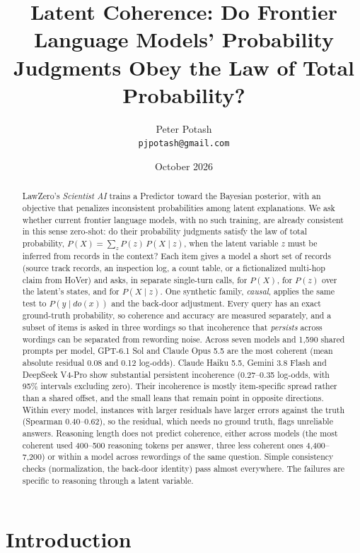 \documentclass[11pt]{article}
\title{\textbf{Latent Coherence: Do Frontier Language Models' Probability\\Judgments Obey the Law of Total Probability?}}
\author{Peter Potash\\\small\texttt{pjpotash@gmail.com}}
\date{October 2026}
\begin{document}
\maketitle

\begin{abstract}
LawZero's \emph{Scientist AI} trains a Predictor toward the Bayesian posterior, with an objective that penalizes inconsistent probabilities among latent explanations. We ask whether current frontier language models, with no such training, are already consistent in this sense zero-shot: do their probability judgments satisfy the law of total probability, $P(X)=\sum_z P(z)\,P(X\mid z)$, when the latent variable $z$ must be inferred from records in the context? Each item gives a model a short set of records (source track records, an inspection log, a count table, or a fictionalized multi-hop claim from HoVer) and asks, in separate single-turn calls, for $P(X)$, for $P(z)$ over the latent's states, and for $P(X\mid z)$. One synthetic family, \emph{causal}, applies the same test to $P(y\mid do(x))$ and the back-door adjustment. Every query has an exact ground-truth probability, so coherence and accuracy are measured separately, and a subset of items is asked in three wordings so that incoherence that \emph{persists} across wordings can be separated from rewording noise. Across seven models and 1,590 shared prompts per model, GPT-6.1 Sol and Claude Opus 5.5 are the most coherent (mean absolute residual 0.08 and 0.12 log-odds). Claude Haiku 5.5, Gemini 3.8 Flash and DeepSeek V4-Pro show substantial persistent incoherence (0.27--0.35 log-odds, with 95\% intervals excluding zero). Their incoherence is mostly item-specific spread rather than a shared offset, and the small leans that remain point in opposite directions. Within every model, instances with larger residuals have larger errors against the truth (Spearman 0.40--0.62), so the residual, which needs no ground truth, flags unreliable answers. Reasoning length does not predict coherence, either across models (the most coherent used 400--500 reasoning tokens per answer, three less coherent ones 4,400--7,200) or within a model across rewordings of the same question. Simple consistency checks (normalization, the back-door identity) pass almost everywhere. The failures are specific to reasoning through a latent variable.
\end{abstract}

\section{Introduction}
\end{document}
